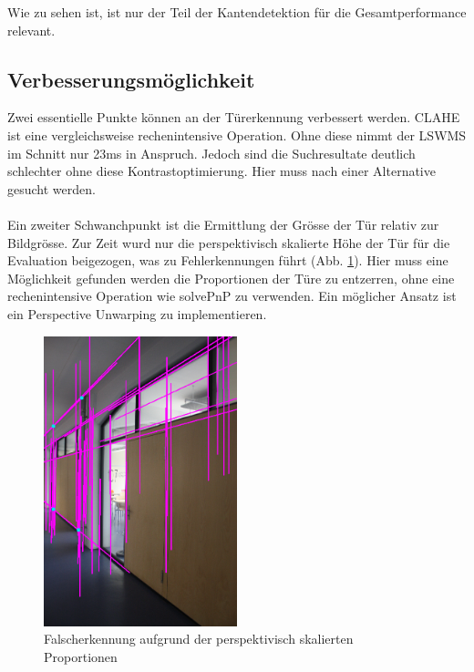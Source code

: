 \noindent
Wie zu sehen ist, ist nur der Teil der Kantendetektion für die Gesamtperformance relevant. 

\subsection{Verbesserungsmöglichkeit}
Zwei essentielle Punkte können an der Türerkennung verbessert werden. CLAHE ist eine vergleichsweise rechenintensive Operation. Ohne diese nimmt der LSWMS im Schnitt nur 23ms in Anspruch. Jedoch sind die Suchresultate deutlich schlechter ohne diese Kontrastoptimierung. Hier muss nach einer Alternative gesucht werden.
\paragraph{}
Ein zweiter Schwanchpunkt ist die Ermittlung der Grösse der Tür relativ zur Bildgrösse. Zur Zeit wurd nur die perspektivisch skalierte Höhe der Tür für die Evaluation beigezogen, was zu Fehlerkennungen führt (Abb. \ref{fig:false-door-detection}). Hier muss eine Möglichkeit gefunden werden die Proportionen der Türe zu entzerren, ohne eine rechenintensive Operation wie solvePnP zu verwenden. Ein möglicher Ansatz ist ein Perspective Unwarping zu implementieren.

\begin{figure}	
\center
\includegraphics[width=0.5\textwidth]{images/false-door-detection}
\caption{Falscherkennung aufgrund der perspektivisch skalierten Proportionen}
\label{fig:false-door-detection}
\end{figure}